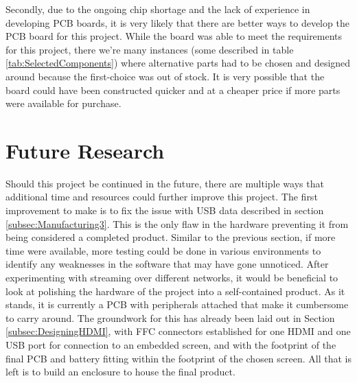 Secondly, due to the ongoing chip shortage and the lack of experience in developing PCB boards, it is very likely that there are better ways to develop the PCB board for this project.
While the board was able to meet the requirements for this project, there we're many instances (some described in table \ref{tab:SelectedComponents}) where alternative parts had to be chosen and designed around because the first-choice was out of stock.
It is very possible that the board could have been constructed quicker and at a cheaper price if more parts were available for purchase.


\section{Future Research}\label{sec:ConclusionFutureResearch}

Should this project be continued in the future, there are multiple ways that additional time and resources could further improve this project.
The first improvement to make is to fix the issue with USB data described in section \ref{subsec:Manufacturing3}.
This is the only flaw in the hardware preventing it from being considered a completed product.
Similar to the previous section, if more time were available, more testing could be done in various environments to identify any weaknesses in the software that may have gone unnoticed.
After experimenting with streaming over different networks, it would be beneficial to look at polishing the hardware of the project into a self-contained product.
As it stands, it is currently a PCB with peripherals attached that make it cumbersome to carry around.
The groundwork for this has already been laid out in Section \ref{subsec:DesigningHDMI}, with FFC connectors established for one HDMI and one USB port for connection to an embedded screen, and with the footprint of the final PCB and battery fitting within the footprint of the chosen screen.
All that is left is to build an enclosure to house the final product.